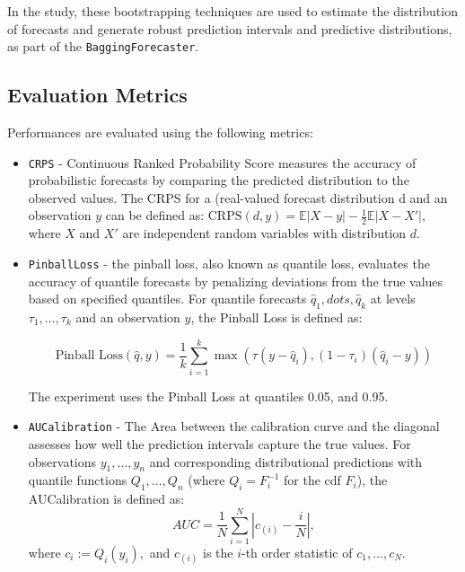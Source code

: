 In the study, these bootstrapping techniques are used to estimate the distribution of forecasts and generate robust prediction intervals and predictive distributions, as part of the \texttt{BaggingForecaster}.


\subsection{Evaluation Metrics}
Performances are evaluated using the following metrics:

\begin{itemize}
    
    \item \texttt{CRPS} - Continuous Ranked Probability Score \cite{matheson1976} measures the accuracy of probabilistic forecasts by comparing the predicted distribution to the observed values. The CRPS for a (real-valued forecast distribution d and an observation $y$ can be defined as: $\text{CRPS}(d, y) = \mathbb{E} \left|X - y\right| - \frac{1}{2} \mathbb{E} \left|X - X'\right|$, where $X$ and $X'$ are independent random variables with distribution $d$.

    \item \texttt{PinballLoss} - the pinball loss, also known as quantile loss, evaluates the accuracy of quantile forecasts by penalizing deviations from the true values based on specified quantiles.
    For quantile forecasts $\hat{q}_1, dots, \hat{q}_k$ at levels $\tau_1, \dots, \tau_k$ and an observation $y$, the Pinball Loss is defined as:

    \begin{equation}
    \text{Pinball Loss}(\hat{q}, y) = \frac{1}{k} \sum_{i=1}^k \max \left(\tau (y - \hat{q}_i), (1 - \tau_i) (\hat{q}_i - y)\right)
    \end{equation}

    The experiment uses the Pinball Loss at quantiles 0.05, and 0.95.

    \item \texttt{AUCalibration} - The Area between the calibration curve and the diagonal assesses how well the prediction intervals capture the true values. For observations $y_1, \dots, y_n$ and corresponding distributional predictions with quantile functions $Q_1, \dots, Q_n$ (where $Q_i = F^{-1}_i$ for the cdf $F_i$), the AUCalibration is defined as:
    \begin{equation}
    AUC = \frac{1}{N} \sum_{i=1}^N \left| c_{(i)} - \frac{i}{N}\right|,
    \end{equation}
    where $c_i := Q_i(y_i),$ and $c_{(i)}$ is the $i$-th order statistic of $c_1, \dots, c_N$.


\end{itemize}

